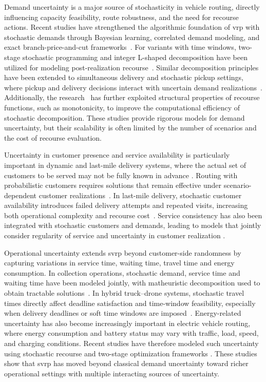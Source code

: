 \documentclass[pdflatex]{sn-jnl}
\begin{document}
Demand uncertainty is a major source of stochasticity in vehicle routing, directly influencing capacity feasibility, route robustness, and the need for recourse actions. Recent studies have strengthened the algorithmic foundation of \gls{vrp} with stochastic demands through Bayesian learning, correlated demand modeling, and exact branch-price-and-cut frameworks~\cite{florio2023recent,kadyrov2025deep}. For variants with time windows, two-stage stochastic programming and integer L-shaped decomposition have been utilized for modeling post-realization recourse~\cite{delavega2023integer}. Similar decomposition principles have been extended to simultaneous delivery and stochastic pickup settings, where pickup and delivery decisions interact with uncertain demand realizations~\cite{che2023integer,lin2025advanced}. Additionally, the research~\cite{parada2024disaggregated} has
further exploited structural properties of recourse functions, such as
monotonicity, to improve the computational efficiency of stochastic
decomposition. These studies provide rigorous models for demand uncertainty, but their scalability is often limited by the number of scenarios and the cost of recourse evaluation.

Uncertainty in customer presence and service availability is particularly important in dynamic and last-mile delivery systems, where the actual set of customers to be served may not be fully known in advance \cite{karels2024vehicle}. Routing with probabilistic customers requires solutions that remain effective under scenario-dependent customer realizations~\cite{lagos2023branch}. In last-mile delivery, stochastic customer availability introduces failed delivery attempts and repeated visits, increasing both operational complexity and recourse cost~\cite{ozarik2023adaptive}. Service consistency has also been integrated with stochastic customers and demands, leading to models that jointly consider regularity of service and uncertainty in customer realization \cite{alvarez2024consistent}. 

Operational uncertainty extends \gls{svrp} beyond customer-side randomness by capturing variations in service time, waiting time, travel time and energy consumption. In collection operations, stochastic demand, service time and waiting time have been modeled jointly, with matheuristic decomposition used to obtain tractable solutions~\cite{reusken2024vehicle}. In hybrid truck--drone
systems, stochastic travel times directly affect deadline satisfaction and time-window feasibility, especially when delivery deadlines or soft time windows are imposed~\cite{meng2024multi,deng2024stochastic}. Energy-related uncertainty has also become increasingly important in electric vehicle routing, where energy consumption and battery status may vary with traffic, load, speed, and charging conditions. Recent studies have therefore modeled such uncertainty using stochastic recourse and two-stage optimization frameworks \cite{spinelli2026stochastic,yuan2026mitigate}. These studies show that
\gls{svrp} has moved beyond classical demand uncertainty toward richer
operational settings with multiple interacting sources of uncertainty.
\end{document}
